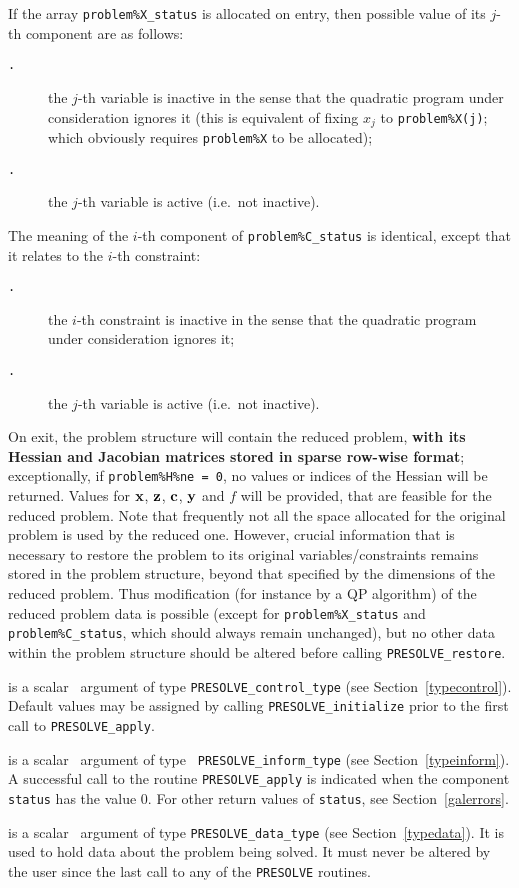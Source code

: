 \documentclass{galahad}
\newcommand{\packagename}{PRESOLVE}
\newcommand{\sym}{\tt\small}
\begin{document}
\begin{description}
\noindent
If the array {\tt problem\%X\_status} is allocated on entry, then possible
value of its $j$-th component are as follows:
\begin{description}
\item[\sym \galsyminactive.] the $j$-th variable is inactive in the sense that
the quadratic program under consideration ignores it (this is equivalent of
fixing $x_j$ to {\tt problem\%X(j)}; which obviously requires {\tt problem\%X}
to be allocated);
\item[\sym \galsymactive. ] the $j$-th variable is active (i.e.\ not
inactive).
\end{description}
The meaning of the $i$-th component of {\tt problem\%C\_status} is identical,
except that it relates to the $i$-th constraint:
\begin{description}
\item[\sym \galsyminactive.] the $i$-th constraint is inactive in the sense
that the quadratic program under consideration ignores it;
\item[\sym \galsymactive. ] the $j$-th variable is active (i.e.\ not
inactive).
\end{description}

\noindent
On exit, the problem structure will contain the reduced problem, {\bf with its
Hessian and Jacobian matrices stored in sparse row-wise format}; exceptionally, 
if {\tt problem\%H\%ne = 0}, no values or indices of the Hessian will be
returned.
Values for ${\mathbf{x}}$, ${\mathbf{z}}$, ${\mathbf{c}}$, ${\mathbf{y}}$ and $f$ will be provided, that are
feasible for the reduced problem. Note that frequently not
all the space allocated for the original problem is used by the
reduced one.  However, crucial information that is necessary to restore the
problem to its original variables/constraints remains stored in the problem
structure, beyond that specified by the dimensions of the reduced problem.
Thus modification (for instance by a QP algorithm) of the reduced problem data
is possible (except for {\tt problem\%X\_status} and {\tt problem\%C\_status},
which should always remain unchanged), but no other data within the problem
structure should be altered before calling {\tt \packagename\_restore}.

 is a scalar \intentinout\ argument of type
{\tt \packagename\_control\_type}
(see Section~\ref{typecontrol}). Default values may be assigned by calling
{\tt \packagename\_initialize} prior to the first call to
{\tt \packagename\_apply}.

 is a scalar \intentinout\ argument of type {\tt
\packagename\_inform\_type}
(see Section~\ref{typeinform}). A successful call to the routine
{\tt \packagename\_apply}
is indicated when the  component {\tt status} has the value 0.
For other return values of {\tt status}, see Section~\ref{galerrors}.

 is a scalar \intentinout\ argument of type
{\tt \packagename\_data\_type}
(see Section~\ref{typedata}). It is used to hold data about the problem being
solved. It must never be  altered by the user since the last call to
any of the {\tt \packagename} routines.

\end{description}
\end{document}

